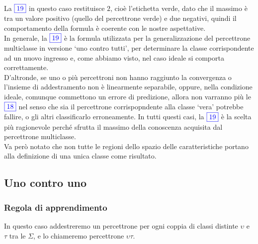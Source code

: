 \documentclass[
  letterpaper,
  DIV=11,
  numbers=noendperiod]{scrreprt}
\begin{document}
La \(\color{blue}\fbox{19}\) in questo caso restituisce \(2\), cioè
l'etichetta verde, dato che il massimo è tra un valore positivo (quello
del percettrone verde) e due negativi, quindi il comportamento della
formula è coerente con le nostre aspettative.\\
In generale, la \(\color{blue}\fbox{19}\) è la formula utilizzata per la
generalizzazione del percettrone multiclasse in versione `uno contro
tutti', per determinare la classe corrispondente ad un nuovo ingresso e,
come abbiamo visto, nel caso ideale si comporta correttamente.\\
D'altronde, se uno o più percettroni non hanno raggiunto la convergenza
o l'insieme di addestramento non è linearmente separabile, oppure, nella
condizione ideale, comunque commettono un errore di predizione, allora
non varranno più le \(\color{blue}\fbox{18}\) nel senso che sia il
percettrone corrispopndente alla classe `vera' potrebbe fallire, o gli
altri classificarlo erroneamente. In tutti questi casi, la
\(\color{blue}\fbox{19}\) è la scelta più ragionevole perché sfrutta il
massimo della conoscenza acquisita dal percettrone multiclasse.\\
Va però notato che non tutte le regioni dello spazio delle
caratteristiche portano alla definizione di una unica classe come
risultato.

\subsection{Uno contro uno}\label{uno-contro-uno}

\subsubsection{Regola di apprendimento}\label{regola-di-apprendimento-2}

In questo caso addestreremo un percettrone per ogni coppia di classi
distinte \(\upsilon\) e \(\tau\) tra le \(\Sigma\), e lo chiameremo
percettrone \(\upsilon\tau\).
\end{document}
